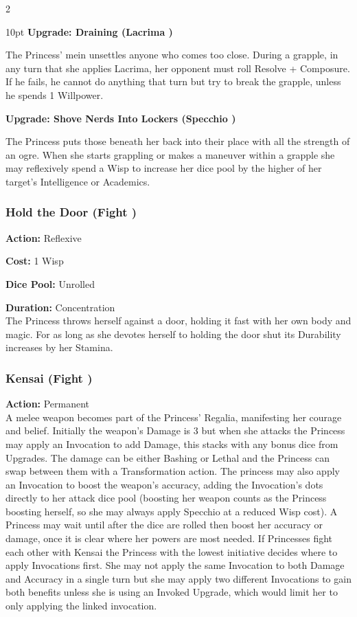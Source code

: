\begin{multicols}{2}
\begin{myindentpar}{10pt}
\textbf{Upgrade: Draining (Lacrima \textbullet\textbullet)}

The Princess' mein unsettles anyone who comes too close. During a grapple, in any turn that she applies Lacrima, her opponent must roll Resolve + Composure. If he fails, he cannot do anything that turn but try to break the grapple, unless he spends 1 Willpower.

\textbf{Upgrade: Shove Nerds Into Lockers  (Specchio \textbullet\textbullet)}

The Princess puts those beneath her back into their place with all the strength of an ogre. When she starts grappling or makes a maneuver within a grapple she may reflexively spend a Wisp to increase her dice pool by the higher of her target's Intelligence or Academics.\end{myindentpar}

\subsubsection*{Hold the Door (Fight \textbullet)}

\noindent \textbf{Action:} Reflexive

\noindent \textbf{Cost:} 1 Wisp

\noindent \textbf{Dice Pool:} Unrolled

\noindent \textbf{Duration:} Concentration\\

The Princess throws herself against a door, holding it fast with her own body and magic. For as long as she devotes herself to holding the door shut its Durability increases by her Stamina. 

\subsubsection*{Kensai (Fight \textbullet)}

\noindent \textbf{Action:} Permanent \\

\noindent A melee weapon becomes part of the Princess’ Regalia, manifesting her courage and belief. Initially the weapon's Damage is 3 but when she attacks the Princess may apply an Invocation to add Damage, this stacks with any bonus dice from Upgrades. The damage can be either Bashing or Lethal and the Princess can swap between them with a Transformation action. The princess may also apply an Invocation to boost the weapon's accuracy, adding the Invocation's dots directly to her attack dice pool (boosting her weapon counts as the Princess boosting herself, so she may always apply Specchio at a reduced Wisp cost). A Princess may wait until after the dice are rolled then boost her accuracy or damage, once it is clear where her powers are most needed. If Princesses fight each other with Kensai the Princess with the lowest initiative decides where to apply Invocations first. She may not apply the same Invocation to both Damage and Accuracy in a single turn but she may apply two different Invocations to gain both benefits unless she is using an Invoked Upgrade, which would limit her to only applying the linked invocation. 


\end{multicols}
